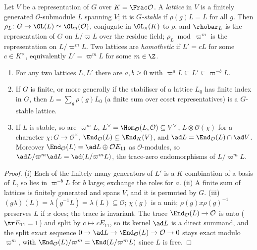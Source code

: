 \begin{definition}\label{def:reps:lattice}
Let $V$ be a representation of $G$ over $K=\Frac\mathcal{O}$. A \emph{lattice} in $V$ is a finitely generated $\mathcal{O}$-submodule $L$ spanning $V$; it is
\emph{$G$-stable} if $\rho(g)L=L$ for all $g$. Then $\rho_L\colon G\to\GL(L)\simeq\GL_n(\mathcal{O})$, conjugate in $\GL_n(K)$ to $\rho$, and $\rhobar_L$ is the representation of
$G$ on $L/\varpi L$ over the residue field; $\rho_L\bmod\varpi^m$ is the representation on $L/\varpi^mL$. Two lattices are \emph{homothetic} if $L'=cL$ for some
$c\in K^\times$, equivalently $L'=\varpi^mL$ for some $m\in\Z$.
\end{definition}

\begin{proposition}\label{prop:reps:lattice}
\begin{enumerate}[label=(\roman*)]
\item For any two lattices $L,L'$ there are $a,b\ge0$ with $\varpi^aL\subseteq L'\subseteq\varpi^{-b}L$.
\item If $G$ is finite, or more generally if the stabiliser of a lattice $L_0$ has finite index in $G$, then $L=\sum_g\rho(g)L_0$ (a finite sum over coset
representatives) is a $G$-stable lattice.
\item If $L$ is stable, so are $\varpi^mL$, $L^\vee=\Hom_\mathcal{O}(L,\mathcal{O})\subseteq V^\vee$, $L\otimes\mathcal{O}(\chi)$ for a character $\chi\colon G\to\mathcal{O}^\times$, $\End_\mathcal{O}(L)\subseteq\End_K(V)$,
and $\ad L=\End_\mathcal{O}(L)\cap\ad V$. Moreover $\End_\mathcal{O}(L)=\ad L\oplus\mathcal{O}E_{11}$ as $\mathcal{O}$-modules, so $\ad L/\varpi^m\ad L=\ad(L/\varpi^mL)$, the trace-zero endomorphisms
of $L/\varpi^mL$.
\end{enumerate}
\end{proposition}

\begin{proof}
(i) Each of the finitely many generators of $L'$ is a $K$-combination of a basis of $L$, so lies in $\varpi^{-b}L$ for $b$ large; exchange the roles for
$a$. (ii) A finite sum of lattices is finitely generated and spans $V$, and it is permuted by $G$. (iii) $(g\lambda)(L)=\lambda(g^{-1}L)=\lambda(L)\subseteq\mathcal{O}$;
$\chi(g)$ is a unit; $\rho(g)x\rho(g)^{-1}$ preserves $L$ if $x$ does; the trace is invariant. The trace $\End_\mathcal{O}(L)\to\mathcal{O}$ is onto ($\tr E_{11}=1$) and split by
$c\mapsto cE_{11}$, so its kernel $\ad L$ is a direct summand, and the split exact sequence $0\to\ad L\to\End_\mathcal{O}(L)\to\mathcal{O}\to0$ stays exact modulo $\varpi^m$, with
$\End_\mathcal{O}(L)/\varpi^m=\End(L/\varpi^mL)$ since $L$ is free.
\end{proof}

